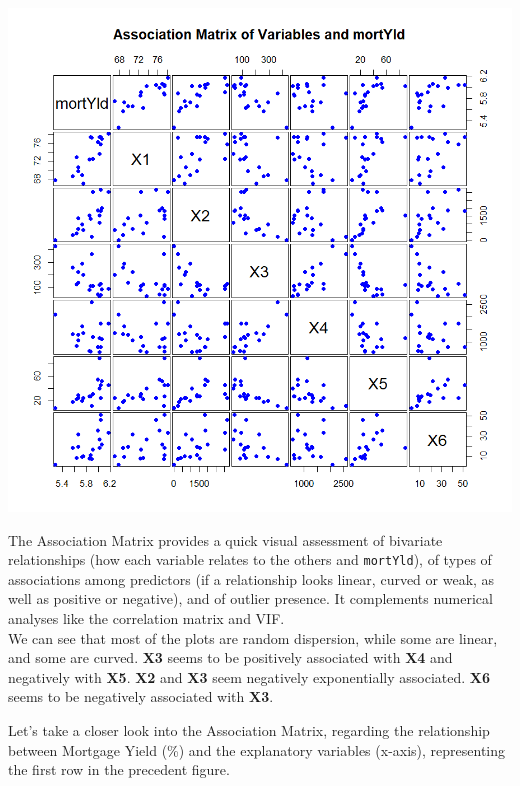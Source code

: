 \documentclass[
  11pt,
]{article}
\begin{document}
\begin{minipage}{0.47\textwidth}
\includegraphics[width=0.85\linewidth]{association_matrix.png}
\end{minipage}
\hfill
\begin{minipage}{0.49\textwidth}
\small
The Association Matrix provides a quick visual assessment of bivariate relationships (how each variable relates to the others and \texttt{mortYld}), of types of associations among predictors (if a relationship looks linear, curved or weak, as well as positive or negative), and of outlier presence. It complements numerical analyses like the correlation matrix and VIF.\\

We can see that most of the plots are random dispersion, while some are linear, and some are curved. \textbf{X3} seems to be positively associated with \textbf{X4} and negatively with \textbf{X5}. \textbf{X2} and \textbf{X3} seem negatively exponentially associated. \textbf{X6} seems to be negatively associated with \textbf{X3}.
\end{minipage}

Let's take a closer look into the Association Matrix, regarding the
relationship between Mortgage Yield (\%) and the explanatory variables
(x-axis), representing the first row in the precedent figure.\\
\end{document}
